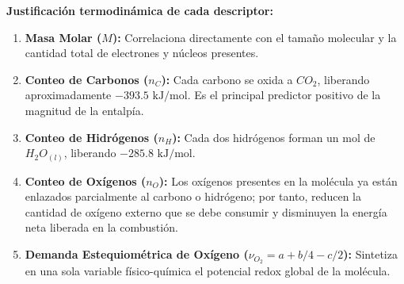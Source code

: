 \documentclass[11pt,letterpaper]{report}
\begin{document}
\noindent\textbf{Justificación termodinámica de cada descriptor:}
\begin{enumerate}[leftmargin=*]
    \item \textbf{Masa Molar ($M$):} Correlaciona directamente con el tamaño molecular y la cantidad total de electrones y núcleos presentes.
    \item \textbf{Conteo de Carbonos ($n_C$):} Cada carbono se oxida a $CO_2$, liberando aproximadamente $-393.5\text{ kJ/mol}$. Es el principal predictor positivo de la magnitud de la entalpía.
    \item \textbf{Conteo de Hidrógenos ($n_H$):} Cada dos hidrógenos forman un mol de $H_2O_{(l)}$, liberando $-285.8\text{ kJ/mol}$.
    \item \textbf{Conteo de Oxígenos ($n_O$):} Los oxígenos presentes en la molécula ya están enlazados parcialmente al carbono o hidrógeno; por tanto, reducen la cantidad de oxígeno externo que se debe consumir y disminuyen la energía neta liberada en la combustión.
    \item \textbf{Demanda Estequiométrica de Oxígeno ($\nu_{O_2} = a + b/4 - c/2$):} Sintetiza en una sola variable físico-química el potencial redox global de la molécula.
\end{enumerate}
\end{document}
